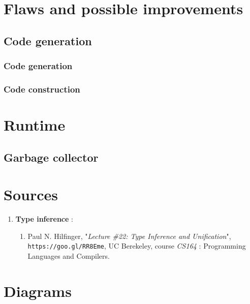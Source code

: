 \documentclass[a4paper,11pt]{article}
\begin{document}
\section{Flaws and possible improvements}\subsection{Code generation}
\subsubsection{Code generation}
\subsubsection{Code construction}
\section{Runtime}
\subsection{Garbage collector}
\label{ssec:garabage_collector}
\appendix
\section{Sources}
\begin{enumerate}
	\item \textbf{Type inference} :
	\begin{enumerate}
		\item\label{enum:inference_unification} Paul N. Hilfinger, "\textit{Lecture \#22: Type Inference and Unification}", \texttt{https://goo.gl/RR8Eme}, UC Berekeley, course \textit{CS164} : Programming Languages and Compilers.
	\end{enumerate}
\end{enumerate}
\section{Diagrams}
\end{document}
